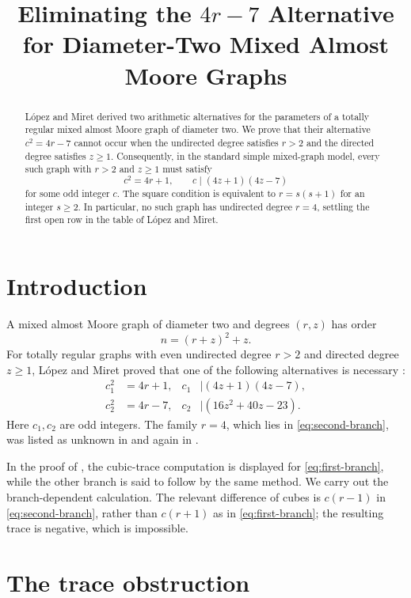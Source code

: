 \documentclass[11pt]{amsart}
\title[Eliminating the $4r-7$ alternative]
{Eliminating the \texorpdfstring{$4r-7$}{4r-7} Alternative for Diameter-Two Mixed Almost Moore Graphs}
\date{}
\begin{document}
\begin{abstract}
L\'opez and Miret derived two arithmetic alternatives for the
parameters of a totally regular mixed almost Moore graph of diameter
two. We prove that their alternative $c^{2}=4r-7$ cannot occur when
the undirected degree satisfies $r>2$ and the directed degree
satisfies $z\geq 1$. Consequently, in the standard simple mixed-graph
model, every such graph with $r>2$ and $z\geq 1$ must satisfy
\[
  c^{2}=4r+1,
  \qquad
  c\mid(4z+1)(4z-7)
\]
for some odd integer $c$. The square condition is equivalent to
$r=s(s+1)$ for an integer $s\geq 2$. In particular, no such graph has
undirected degree $r=4$, settling the first open row in the table of
L\'opez and Miret.
\end{abstract}

\maketitle

\section{Introduction}

A mixed almost Moore graph of diameter two and degrees $(r,z)$ has
order
\[
  n=(r+z)^2+z.
\]
For totally regular graphs with even undirected degree $r>2$ and
directed degree $z\geq 1$, L\'opez and Miret proved that one of the
following alternatives is necessary \cite[Theorem~2]{LM}:
\begin{align}
  c_1^2&=4r+1,
  & c_1&\mid(4z+1)(4z-7), \label{eq:first-branch}\\
  c_2^2&=4r-7,
  & c_2&\mid(16z^2+40z-23). \label{eq:second-branch}
\end{align}
Here $c_1,c_2$ are odd integers. The family $r=4$, which lies in
\eqref{eq:second-branch}, was listed as unknown in
\cite[Table~1]{LM} and again in \cite[Table~1]{DFL}.

In the proof of \cite[Proposition~4]{LM}, the cubic-trace computation
is displayed for \eqref{eq:first-branch}, while the other branch is
said to follow by the same method. We carry out the branch-dependent
calculation. The relevant difference of cubes is $c(r-1)$ in
\eqref{eq:second-branch}, rather than $c(r+1)$ as in
\eqref{eq:first-branch}; the resulting trace is negative, which is
impossible.

\section{The trace obstruction}
\end{document}
